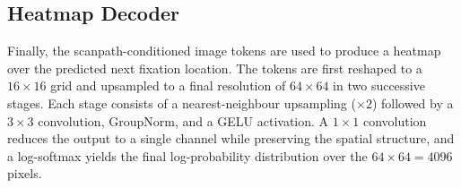 \subsection{Heatmap Decoder}
\label{sec:decoder}
Finally, the scanpath-conditioned image tokens are used to produce a heatmap
over the predicted next fixation location. The tokens are first reshaped to a
$16\times16$ grid and upsampled to a final resolution of $64\times64$ in two
successive stages. Each stage consists of a nearest-neighbour upsampling
($\times2$) followed by a $3\times3$ convolution, GroupNorm, and a GELU
activation. A $1\times1$ convolution reduces the output to a single channel
while preserving the spatial structure, and a log-softmax yields the final
log-probability distribution over the $64\times64 = 4096$ pixels.
